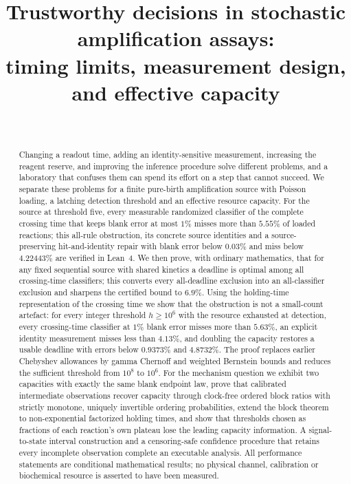 \documentclass[11pt,a4paper]{article}
\title{Trustworthy decisions in stochastic amplification assays:\\
timing limits, measurement design, and effective capacity}
\author{\PaperAuthor\\[2pt]\small\PaperAffiliation}
\date{\PaperDate}
\theoremstyle{plain}
\theoremstyle{definition}
\theoremstyle{remark}
\begin{document}
\maketitle

\begin{abstract}
Changing a readout time, adding an identity-sensitive measurement, increasing the reagent reserve, and improving the inference procedure solve different problems, and a laboratory that confuses them can spend its effort on a step that cannot succeed. We separate these problems for a finite pure-birth amplification source with Poisson loading, a latching detection threshold and an effective resource capacity. For the source at threshold five, every measurable randomized classifier of the complete crossing time that keeps blank error at most $1\%$ misses more than $5.55\%$ of loaded reactions; this all-rule obstruction, its concrete source identities and a source-preserving hit-and-identity repair with blank error below $0.03\%$ and miss below $4.22443\%$ are verified in Lean~4. We then prove, with ordinary mathematics, that for any fixed sequential source with shared kinetics a deadline is optimal among all crossing-time classifiers; this converts every all-deadline exclusion into an all-classifier exclusion and sharpens the certified bound to $6.9\%$. Using the holding-time representation of the crossing time we show that the obstruction is not a small-count artefact: for every integer threshold $h\ge10^{6}$ with the resource exhausted at detection, every crossing-time classifier at $1\%$ blank error misses more than $5.63\%$, an explicit identity measurement misses less than $4.13\%$, and doubling the capacity restores a usable deadline with errors below $0.9373\%$ and $4.8732\%$. The proof replaces earlier Chebyshev allowances by gamma Chernoff and weighted Bernstein bounds and reduces the sufficient threshold from $10^{8}$ to $10^{6}$. For the mechanism question we exhibit two capacities with exactly the same blank endpoint law, prove that calibrated intermediate observations recover capacity through clock-free ordered block ratios with strictly monotone, uniquely invertible ordering probabilities, extend the block theorem to non-exponential factorized holding times, and show that thresholds chosen as fractions of each reaction's own plateau lose the leading capacity information. A signal-to-state interval construction and a censoring-safe confidence procedure that retains every incomplete observation complete an executable analysis. All performance statements are conditional mathematical results; no physical channel, calibration or biochemical resource is asserted to have been measured.
\end{abstract}
\end{document}
